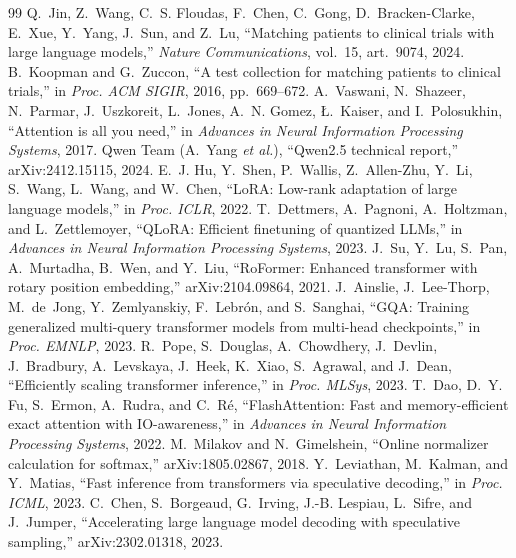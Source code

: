 \documentclass[conference]{IEEEtran}
\begin{document}
\begin{thebibliography}{99}
 Q.~Jin, Z.~Wang, C.~S. Floudas, F.~Chen, C.~Gong, D.~Bracken-Clarke, E.~Xue, Y.~Yang, J.~Sun, and Z.~Lu, ``Matching patients to clinical trials with large language models,'' \emph{Nature Communications}, vol.~15, art.~9074, 2024.
 B.~Koopman and G.~Zuccon, ``A test collection for matching patients to clinical trials,'' in \emph{Proc. ACM SIGIR}, 2016, pp.~669--672.
 A.~Vaswani, N.~Shazeer, N.~Parmar, J.~Uszkoreit, L.~Jones, A.~N. Gomez, {\L}.~Kaiser, and I.~Polosukhin, ``Attention is all you need,'' in \emph{Advances in Neural Information Processing Systems}, 2017.
 Qwen Team (A.~Yang \emph{et al.}), ``Qwen2.5 technical report,'' arXiv:2412.15115, 2024.
 E.~J. Hu, Y.~Shen, P.~Wallis, Z.~Allen-Zhu, Y.~Li, S.~Wang, L.~Wang, and W.~Chen, ``LoRA: Low-rank adaptation of large language models,'' in \emph{Proc. ICLR}, 2022.
 T.~Dettmers, A.~Pagnoni, A.~Holtzman, and L.~Zettlemoyer, ``QLoRA: Efficient finetuning of quantized LLMs,'' in \emph{Advances in Neural Information Processing Systems}, 2023.
 J.~Su, Y.~Lu, S.~Pan, A.~Murtadha, B.~Wen, and Y.~Liu, ``RoFormer: Enhanced transformer with rotary position embedding,'' arXiv:2104.09864, 2021.
 J.~Ainslie, J.~Lee-Thorp, M.~de~Jong, Y.~Zemlyanskiy, F.~Lebr{\'o}n, and S.~Sanghai, ``GQA: Training generalized multi-query transformer models from multi-head checkpoints,'' in \emph{Proc. EMNLP}, 2023.
 R.~Pope, S.~Douglas, A.~Chowdhery, J.~Devlin, J.~Bradbury, A.~Levskaya, J.~Heek, K.~Xiao, S.~Agrawal, and J.~Dean, ``Efficiently scaling transformer inference,'' in \emph{Proc. MLSys}, 2023.
 T.~Dao, D.~Y. Fu, S.~Ermon, A.~Rudra, and C.~R{\'e}, ``FlashAttention: Fast and memory-efficient exact attention with IO-awareness,'' in \emph{Advances in Neural Information Processing Systems}, 2022.
 M.~Milakov and N.~Gimelshein, ``Online normalizer calculation for softmax,'' arXiv:1805.02867, 2018.
 Y.~Leviathan, M.~Kalman, and Y.~Matias, ``Fast inference from transformers via speculative decoding,'' in \emph{Proc. ICML}, 2023.
 C.~Chen, S.~Borgeaud, G.~Irving, J.-B. Lespiau, L.~Sifre, and J.~Jumper, ``Accelerating large language model decoding with speculative sampling,'' arXiv:2302.01318, 2023.
\end{thebibliography}
\end{document}
